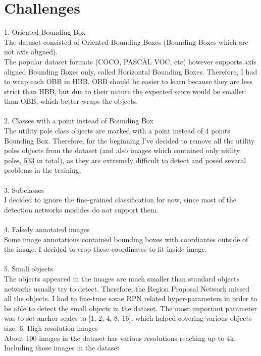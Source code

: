 \documentclass[]{article}
\begin{document}
\section{Challenges}
1. Oriented Bounding Box \\
The dataset consisted of Oriented Bounding Boxes (Bounding Boxes which are not axis aligned). \\
The popular dataset formats (COCO, PASCAL VOC, etc) however supports axis aligned Bounding Boxes only, called Horizontal Bounding Boxes. 
Therefore, I had to wrap each OBB in HBB.  
OBB should be easier to learn because they are less strict than HBB, but due to their nature the expected score would be smaller than OBB, which better wraps the objects.
\\\\
2. Classes with a point instead of Bounding Box\\
The utility pole class objects are marked with a point instead of 4 points Bounding Box. Therefore, for the beginning I've decided to remove all the utility poles objects from the dataset (and also images which contained only utility poles, 533 in total), as they are extremely difficult to detect and posed several problems in the training.
\\\\
3. Subclasses\\
I decided to ignore the fine-grained classification for now, since most of the detection networks modules do not support them.
\\\\
4. Falsely annotated images\\
Some image annotations contained bounding boxes with coordiantes outside of the image. I decided to crop these coordinates to fit inside image.
\\\\
5. Small objects\\
The objects appeared in the images are much smaller than standard objects networks usually try to detect. Therefore, the Region Proposal Network missed all the objects. I had to fine-tune some RPN related hyper-parameters in order to be able to detect the small objects in the dataset. The most important parameter was to set anchor scales to [1, 2, 4, 8, 16], which helped covering various objects size.
6. High resolution images\\
About 100 images in the dataset has various resolutions reaching up to 4k. Including those images in the dataset 
\end{document}
